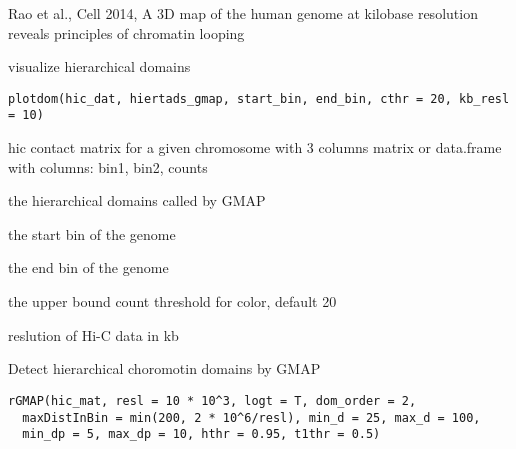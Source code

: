 \documentclass[a4paper]{book}
\begin{document}
%
\begin{Source}\relax
Rao et al., Cell 2014, A 3D map of the human genome at kilobase resolution reveals principles of chromatin looping
\end{Source}
%
\begin{Description}\relax
visualize hierarchical domains
\end{Description}
%
\begin{Usage}
\begin{verbatim}
plotdom(hic_dat, hiertads_gmap, start_bin, end_bin, cthr = 20, kb_resl = 10)
\end{verbatim}
\end{Usage}
%
\begin{Arguments}
\begin{ldescription}
\item[\code{hic\_dat}] hic contact matrix for a given chromosome with 3 columns
matrix or data.frame with columns: bin1, bin2, counts

\item[\code{hiertads\_gmap}] the hierarchical domains called by GMAP

\item[\code{start\_bin}] the start bin of the genome

\item[\code{end\_bin}] the end bin of the genome

\item[\code{cthr}] the upper bound count threshold for color, default 20

\item[\code{kb\_resl}] reslution of Hi-C data in kb
\end{ldescription}
\end{Arguments}
%
\begin{Description}\relax
Detect hierarchical choromotin domains by GMAP
\end{Description}
%
\begin{Usage}
\begin{verbatim}
rGMAP(hic_mat, resl = 10 * 10^3, logt = T, dom_order = 2,
  maxDistInBin = min(200, 2 * 10^6/resl), min_d = 25, max_d = 100,
  min_dp = 5, max_dp = 10, hthr = 0.95, t1thr = 0.5)
\end{verbatim}
\end{Usage}
%
\end{document}
